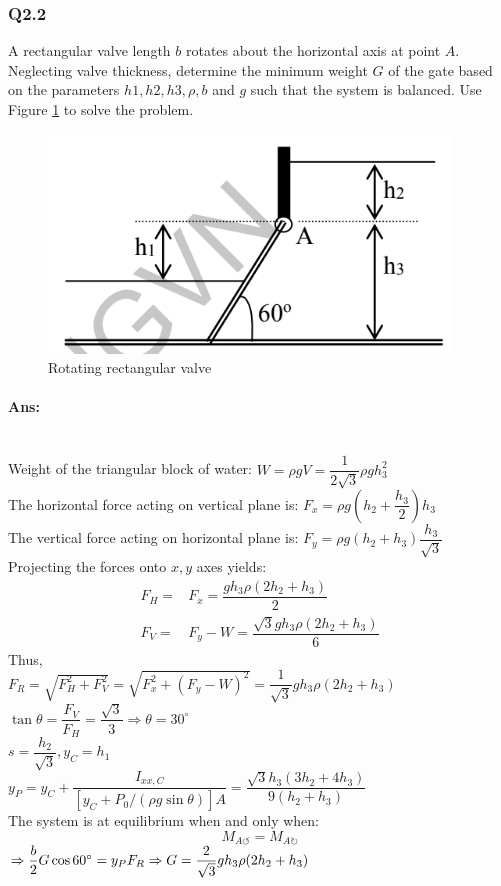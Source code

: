 \subsubsection{Q2.2} A rectangular valve length $ b $ rotates about the horizontal axis at point $ A $. Neglecting valve thickness, determine the minimum weight $ G $ of the gate based on the parameters $  h1, h2, h3, \rho, b $ and $ g $ such that the system is balanced. Use Figure \ref{fig:2} to solve the problem.
\begin{figure}[h]
	\centering
	\includegraphics[width=0.4\linewidth]{"2020-08-13 17.45.37 drive.google.com bc14c8504f54"}
	\caption{Rotating rectangular valve}
	\label{fig:2}
\end{figure}
\paragraph{Ans:}$  $\\
Weight of the triangular block of water: $ W=\rho g V=\dfrac{1}{2\sqrt{3}}\rho g h_3^2 $\\
The horizontal force acting on vertical plane is: $ F_x = \rho g\left(h_2+\dfrac{h_3}{2}\right)h_3 $\\
The vertical force acting on horizontal plane is: $ F_y = \rho g(h_2+h_3)\dfrac{h_3}{\sqrt{3}} $\\
Projecting the forces onto $ x,y $ axes yields:
\[\begin{array}{ll}
F_H=&F_x=\dfrac{g h_{3} \rho \left(2 h_{2} + h_{3}\right)}{2}
\\
F_V=&F_y-W=\dfrac{\sqrt{3} g h_{3} \rho \left(2 h_{2} + h_{3}\right)}{6}

\end{array}\]
Thus, \\
$ F_R=\sqrt{F_H^2+F_V^2}=\sqrt{F_x^2+(F_y-W)^2}=\dfrac{1}{\sqrt{3}} gh_{3} \rho(2h_2+h_3)
$\\
$ \tan\theta=\dfrac{F_V}{F_H}=\dfrac{\sqrt{3}}{3}\Rightarrow\theta=30^\circ $\\
$ s = \dfrac{h_2}{\sqrt{3}} ,y_C = h_1$\\
$ y_P=y_C+\dfrac{I_{xx,C}}{[y_C+P_0/(\rho g\sin\theta)]A} = \dfrac{\sqrt{3} h_{3} \left(3 h_{2} + 4 h_{3}\right)}{9 \left(h_{2} + h_{3}\right)}
$\\
The system is at equilibrium when and only when:
\[ M_{A\circlearrowleft} = M_{A\circlearrowright}\]
$ \Rightarrow \dfrac{b}{2}G\cos60^\circ = y_PF_R\\\Rightarrow G = \dfrac{2}{\sqrt{3}} gh_{3} \rho(2h_2+h_3) $


